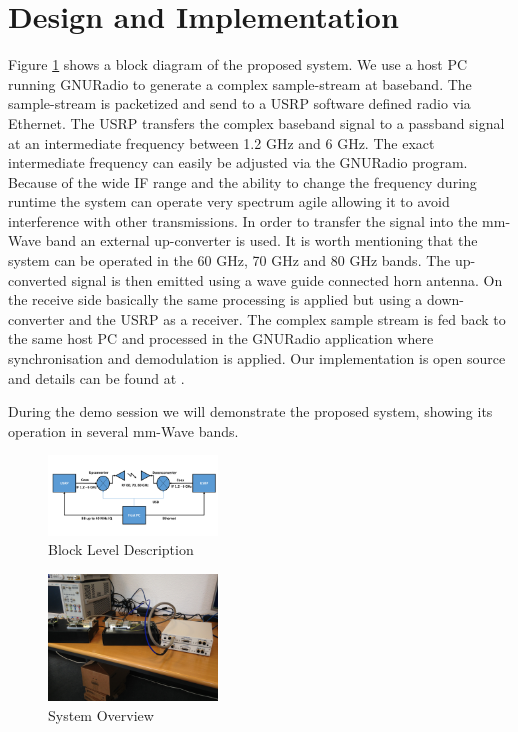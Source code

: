 \documentclass{acm_proc_article-sp}
\begin{document}
\section{Design and Implementation}
Figure \ref{fig:block} shows a block diagram of the proposed system. 
We use a host PC running GNURadio \cite{gnuradio} to generate a complex sample-stream at baseband. The sample-stream is packetized and send to a USRP \cite{ettus} software defined radio via Ethernet.
The USRP transfers the complex baseband signal to a passband signal at an intermediate frequency between 1.2 GHz and 6 GHz. The exact intermediate frequency can easily be adjusted via the GNURadio program. Because of the wide IF range and the ability to change the frequency during runtime the system can operate very spectrum agile allowing it to avoid interference with other transmissions.
In order to transfer the signal into the mm-Wave band an external up-converter is used. It is worth mentioning that the system can be operated in the 60 GHz, 70 GHz and 80 GHz bands.
The up-converted signal is then emitted using a wave guide connected horn antenna.
On the receive side basically the same processing is applied but using a down-converter and the USRP as a receiver. The complex sample stream is fed back to the same host PC and processed in the GNURadio application where synchronisation and demodulation is applied.
Our implementation is open source and details can be found at \cite{gr-inets}. 

During the demo session we will demonstrate the proposed system, showing its operation in several mm-Wave bands.

\begin{figure}
\center
\includegraphics[width=0.4\textwidth]{block-diagram}
\caption{Block Level Description}
\label{fig:block}
\end{figure}

\begin{figure}
\center
\includegraphics[width=0.4\textwidth]{system.jpg}
\caption{System Overview}
\label{fig:system}
\end{figure}
\end{document}
